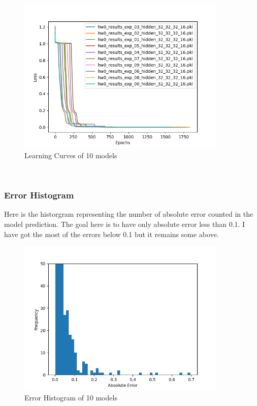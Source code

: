 \documentclass[11pt]{article}
\begin{document}
\begin{figure}[htbp]
\centering
\includegraphics[width=10cm]{img/learning_curves.png}
\caption{Learning Curves of 10 models}
\end{figure}\\[0pt]

\subsubsection{Error Histogram}
\label{sec:org9225686}

Here is the historgram representing the number of absolute error counted in the model prediction. The goal here is to have only absolute error less than 0.1. I have got the most of the errors below 0.1 but it remains some above.\\[0pt]

\begin{figure}[htbp]
\centering
\includegraphics[width=10cm]{img/error_histogram.png}
\caption{Error Histogram of 10 models}
\end{figure}\\[0pt]
\end{document}

